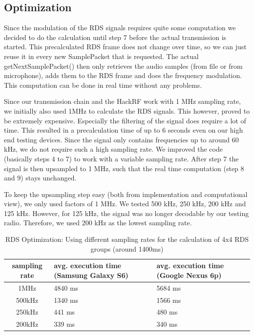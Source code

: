 \subsection{Optimization}
Since the modulation of the RDS signals requires quite some computation we decided to do the calculation until step 7 before the actual transmission is started. This precalculated RDS frame does not change over time, so we can just reuse it in every new SamplePacket that is requested. The actual getNextSamplePacket() then only retrieves the audio samples (from file or from microphone), adds them to the RDS frame and does the frequency modulation. This computation can be done in real time without any problems. 

Since our transmission chain and the HackRF work with 1 MHz sampling rate, we initially also used 1MHz to calculate the RDS signals. This however, proved to be extremely expensive. Especially the filtering of the signal does require a lot of time. This resulted in a precalculation time of up to 6 seconds even on our high end testing devices. Since the signal only contains frequencies up to around 60 kHz, we do not require such a high sampling rate. We improved the code (basically steps 4 to 7) to work with a variable sampling rate. After step 7 the signal is then upsampled to 1 MHz, such that the real time computation (step 8 and 9) stays unchanged.

To keep the upsampling step easy (both from implementation and computational view), we only used factors of 1 MHz. We tested 500 kHz, 250 kHz, 200 kHz and 125 kHz. However, for 125 kHz, the signal was no longer decodable by our testing radio. Therefore, we used 200 kHz as the lowest sampling rate. 


\begin{table}

	\caption{RDS Optimization: Using different sampling rates for the calculation of 4x4 RDS groups (around 1400ms)}
		\label{tab:rds_optimization}
	
	\begin{tabular}{c | p{4cm} | p{4cm} }
		sampling rate &  avg. execution time (Samsung Galaxy S6) & avg. execution time (Google Nexus 6p) \\ \hline
		1MHz	& 4840 ms & 5684 ms \\ \hline 
		500kHz	& 1340 ms & 1566 ms \\ \hline
		250kHz 	& 441 ms  & 480 ms\\ \hline
		200kHz 	& 339 ms  & 340 ms 
		
	\end{tabular}
\end{table}

